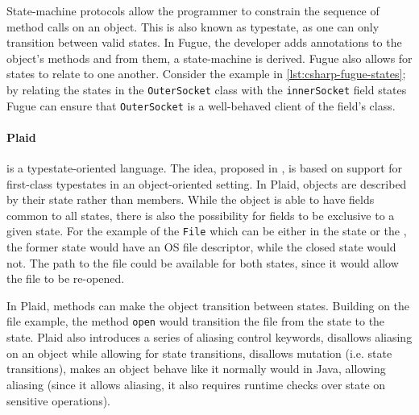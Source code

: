 State-machine protocols allow the programmer to constrain the sequence of method calls on an object.
This is also known as typestate, as one can only transition between valid states.
In Fugue, the developer adds annotations to the object's methods and from them, a state-machine is derived.
Fugue also allows for states to relate to one another.
Consider the example in \autoref{lst:csharp-fugue-states}; by relating the states in the \texttt{OuterSocket} class
with the \texttt{innerSocket} field states Fugue can ensure that \texttt{OuterSocket} is a well-behaved client of the field's class.



\paragraph{Plaid} is a typestate-oriented language.
The idea, proposed in \autocite{Aldrich2009}, is based on support for first-class typestates in an object-oriented setting.
In Plaid, objects are described by their state rather than members.
While the object is able to have fields common to all states, there is also the possibility for fields to be exclusive to a given state.
For the example of the \texttt{File} which can be either in the  state or the , the former state would have an OS file descriptor,
while the closed state would not. The path to the file could be available for both states, since it would allow the file to be re-opened.

In Plaid, methods can make the object transition between states. Building on the file example,
the method \texttt{open} would transition the file from the  state to the  state.
Plaid also introduces a series of aliasing control keywords,
 disallows aliasing on an object while allowing for state transitions,
 disallows mutation (i.e. state transitions),
 makes an object behave like it normally would in Java,
allowing aliasing (since it allows aliasing, it also requires runtime checks over state on sensitive operations).

